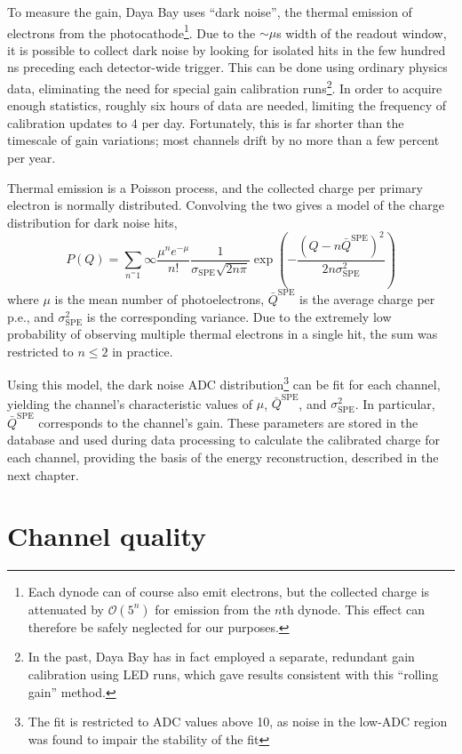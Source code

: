 \documentclass[../thesis.tex]{subfiles}
\begin{document}
To measure the gain, Daya Bay uses ``dark noise'', the thermal emission of electrons from the photocathode\footnote{Each dynode can of course also emit electrons, but the collected charge is attenuated by $\mathcal{O}(5^n)$ for emission from the $n$th dynode. This effect can therefore be safely neglected for our purposes.}. Due to the $\sim\mu$s width of the readout window, it is possible to collect dark noise by looking for isolated hits in the few hundred ns preceding each detector-wide trigger. This can be done using ordinary physics data, eliminating the need for special gain calibration runs\footnote{In the past, Daya Bay has in fact employed a separate, redundant gain calibration using LED runs, which gave results consistent with this ``rolling gain'' method.}. In order to acquire enough statistics, roughly six hours of data are needed, limiting the frequency of calibration updates to 4 per day. Fortunately, this is far shorter than the timescale of gain variations; most channels drift by no more than a few percent per year. %

Thermal emission is a Poisson process, and the collected charge per primary electron is normally distributed. Convolving the two gives a model of the charge distribution for dark noise hits,
\[ P(Q) = \sum_{n^=1}{\infty} \frac{\mu^n e^{-\mu}}{n!} \frac{1}{\sigma_{\mathrm{SPE}}\sqrt{2n\pi}}
  \exp\left(-\frac{(Q - n\bar Q^{\mathrm{SPE}})^2}{2n\sigma_{\mathrm{SPE}}^2}\right) \]
where $\mu$ is the mean number of photoelectrons, $\bar Q^{\mathrm{SPE}}$ is the average charge per p.e., and $\sigma_{\mathrm{SPE}}^2$ is the corresponding variance. Due to the extremely low probability of observing multiple thermal electrons in a single hit, the sum was restricted to $n \le 2$ in practice.

Using this model, the dark noise ADC distribution\footnote{The fit is restricted to ADC values above 10, as noise in the low-ADC region was found to impair the stability of the fit} can be fit for each channel, yielding the channel's characteristic values of $\mu$, $\bar Q^{\mathrm{SPE}}$, and $\sigma_{\mathrm{SPE}}^2$. In particular, $\bar Q^{\mathrm{SPE}}$ corresponds to the channel's gain. These parameters are stored in the database and used during data processing to calculate the calibrated charge for each channel, providing the basis of the energy reconstruction, described in the next chapter.

\section{Channel quality}

\subfilebackmatter
\end{document}
